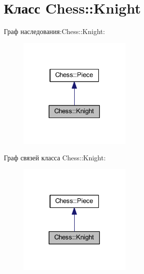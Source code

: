 \hypertarget{class_chess_1_1_knight}{}\section{Класс Chess\+:\+:Knight}
\label{class_chess_1_1_knight}


Граф наследования\+:Chess\+:\+:Knight\+:\nopagebreak
\begin{figure}[H]
\begin{center}
\leavevmode
\includegraphics[width=158pt]{class_chess_1_1_knight__inherit__graph}
\end{center}
\end{figure}


Граф связей класса Chess\+:\+:Knight\+:\nopagebreak
\begin{figure}[H]
\begin{center}
\leavevmode
\includegraphics[width=158pt]{class_chess_1_1_knight__coll__graph}
\end{center}
\end{figure}

